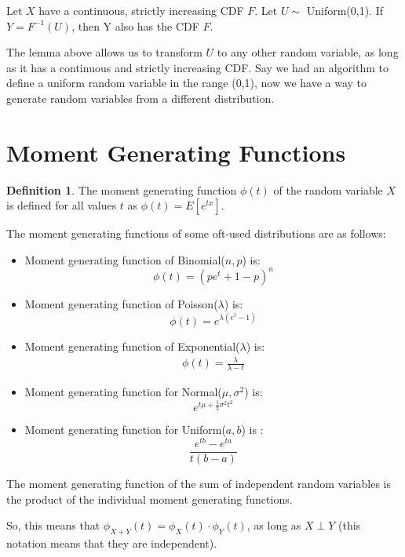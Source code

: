 \documentclass[12pt,letterpaper]{amsbook}
\theoremstyle{definition}
\newtheorem{definition}{Definition}%
\begin{document}
\begin{lemma}
  Let $X$ have a continuous, strictly increasing CDF $F$. Let $U \sim $ Uniform(0,1). If $Y = F^{-1}(U)$, then Y also has the CDF $F$. 
\end{lemma}

The lemma above allows us to transform $U$ to any other random variable, as long as it has a continuous and strictly increasing CDF. Say we had an algorithm to define a uniform random variable in the range (0,1), now we have a way to generate random variables from a different distribution.

\section{Moment Generating Functions}

\begin{definition}
  The moment generating function $\phi(t)$ of the random variable $X$ is defined for all values $t$ as $\phi(t) = E[e^{tx}]$.
\end{definition}

The moment generating functions of some oft-used distributions are as follows:

\begin{itemize}
  \item Moment generating function of Binomial($n,p$) is:
    \[ \phi(t) = (pe^t + 1 - p)^n\]
  \item Moment generating function of Poisson($\lambda$) is:
    \[  \phi(t) = e^{\lambda(e^t-1)}\]
  \item Moment generating function of Exponential($\lambda$) is:
    \begin{align*}
      \phi(t) = \frac{\lambda}{\lambda-t}
    \end{align*}
  \item Moment generating function for Normal($\mu, \sigma^2$) is:
    \[e^{t \mu + \frac{1}{2} \sigma^2 t^2}\]
  \item Moment generating function for Uniform($a,b$) is :
    \[\frac{e^{tb} - e^{ta}}{t(b-a)}\]
\end{itemize}

\begin{theorem}
  The moment generating function of the sum of independent random variables is the product of the individual moment generating functions.
\end{theorem}

So, this means that $\phi_{X+Y}(t) = \phi_X(t) \cdot \phi_Y(t)$, as long as $X \perp Y$ (this notation means that they are independent).
\end{document}

